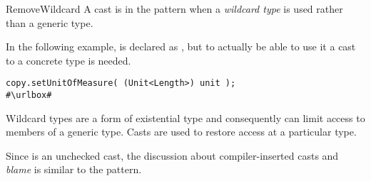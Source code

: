 \begin{pattern}{RemoveWildcard}
A cast is in the \thisp{} pattern when a \emph{wildcard type} is used rather than a generic type.


\instances{}
In the following example,%
\def\urlvar{http://bit.ly/eclipse_jetty_project_2WMI0Ld}
 is declared as ,
but to actually be able to use it a cast to a concrete type is needed.

\begin{verbatim}
copy.setUnitOfMeasure( (Unit<Length>) unit );
#\urlbox#
\end{verbatim}


\discussion{}
Wildcard types are a form of existential type and consequently can limit
access to members of a generic type.
Casts are used to restore access at a particular type.

Since \thisp{} is an unchecked cast,
the discussion about compiler-inserted casts and \emph{blame} is similar to the  pattern.

\end{pattern}
